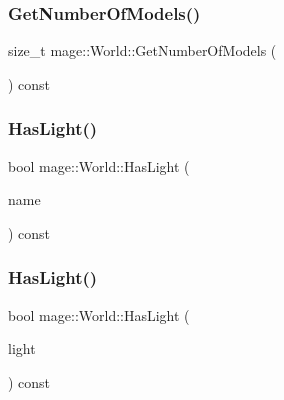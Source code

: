 \hypertarget{classmage_1_1_world_a6e04fdde74a2616746cdafd12537c4a7}{}\label{classmage_1_1_world_a6e04fdde74a2616746cdafd12537c4a7} 
\subsubsection{\texorpdfstring{Get\+Number\+Of\+Models()}{GetNumberOfModels()}}
{\footnotesize\ttfamily size\+\_\+t mage\+::\+World\+::\+Get\+Number\+Of\+Models (\begin{DoxyParamCaption}{ }\end{DoxyParamCaption}) const}

\hypertarget{classmage_1_1_world_af83318e3810a5658aa37285df708aa81}{}\label{classmage_1_1_world_af83318e3810a5658aa37285df708aa81} 
\subsubsection{\texorpdfstring{Has\+Light()}{HasLight()}\hspace{0.1cm}{\footnotesize\ttfamily [1/2]}}
{\footnotesize\ttfamily bool mage\+::\+World\+::\+Has\+Light (\begin{DoxyParamCaption}\item[{const string \&}]{name }\end{DoxyParamCaption}) const}

\hypertarget{classmage_1_1_world_ac76eb3df75c68ec28b7a9db9b0576171}{}\label{classmage_1_1_world_ac76eb3df75c68ec28b7a9db9b0576171} 
\subsubsection{\texorpdfstring{Has\+Light()}{HasLight()}\hspace{0.1cm}{\footnotesize\ttfamily [2/2]}}
{\footnotesize\ttfamily bool mage\+::\+World\+::\+Has\+Light (\begin{DoxyParamCaption}\item[{const \hyperlink{namespacemage_a1e01ae66713838a7a67d30e44c67703e}{Shared\+Ptr}$<$ \hyperlink{classmage_1_1_point_light}{Point\+Light} $>$}]{light }\end{DoxyParamCaption}) const}

